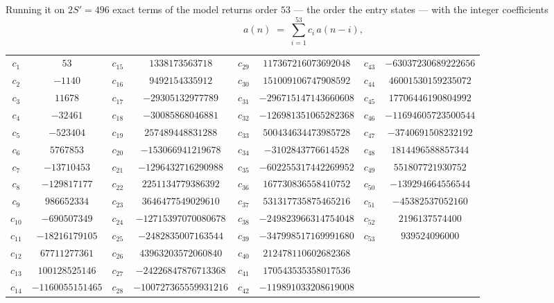 \documentclass[11pt,a4paper]{article}
\theoremstyle{plain}
\theoremstyle{definition}
\begin{document}
Running it on $2S'=496$ exact terms of the model returns order $53$ --- the order the
entry states --- with the integer coefficients
\[
a(n)\;=\;\sum_{i=1}^{53}c_i\,a(n-i),
\]
\begin{center}\small
\begin{tabular}{cccccccc}
$c_{1}$ & $53$ & $c_{15}$ & $1338173563718$ & $c_{29}$ & $117367216073692048$ & $c_{43}$ & $-63037230689222656$ \\
$c_{2}$ & $-1140$ & $c_{16}$ & $9492154335912$ & $c_{30}$ & $151009106747908592$ & $c_{44}$ & $46001530159235072$ \\
$c_{3}$ & $11678$ & $c_{17}$ & $-29305132977789$ & $c_{31}$ & $-296715147143660608$ & $c_{45}$ & $17706446190804992$ \\
$c_{4}$ & $-32461$ & $c_{18}$ & $-30085868046881$ & $c_{32}$ & $-126981351065282368$ & $c_{46}$ & $-11694605723500544$ \\
$c_{5}$ & $-523404$ & $c_{19}$ & $257489448831288$ & $c_{33}$ & $500434634473985728$ & $c_{47}$ & $-3740691508232192$ \\
$c_{6}$ & $5767853$ & $c_{20}$ & $-153066941219678$ & $c_{34}$ & $-3102843776614528$ & $c_{48}$ & $1814496588857344$ \\
$c_{7}$ & $-13710453$ & $c_{21}$ & $-1296432716290988$ & $c_{35}$ & $-602255317442269952$ & $c_{49}$ & $551807721930752$ \\
$c_{8}$ & $-129817177$ & $c_{22}$ & $2251134779386392$ & $c_{36}$ & $167730836558410752$ & $c_{50}$ & $-139294664556544$ \\
$c_{9}$ & $986652334$ & $c_{23}$ & $3646477549029610$ & $c_{37}$ & $531317735875465216$ & $c_{51}$ & $-45382537052160$ \\
$c_{10}$ & $-690507349$ & $c_{24}$ & $-12715397070080678$ & $c_{38}$ & $-249823966314754048$ & $c_{52}$ & $2196137574400$ \\
$c_{11}$ & $-18216179105$ & $c_{25}$ & $-2482835007163544$ & $c_{39}$ & $-347998517169991680$ & $c_{53}$ & $939524096000$ \\
$c_{12}$ & $67711277361$ & $c_{26}$ & $43963203572060840$ & $c_{40}$ & $212478110602682368$ &  &  \\
$c_{13}$ & $100128525146$ & $c_{27}$ & $-24226847876713368$ & $c_{41}$ & $170543535358017536$ &  &  \\
$c_{14}$ & $-1160055151465$ & $c_{28}$ & $-100727365559931216$ & $c_{42}$ & $-119891033208619008$ &  &  \\
\end{tabular}
\end{center}
\end{document}
